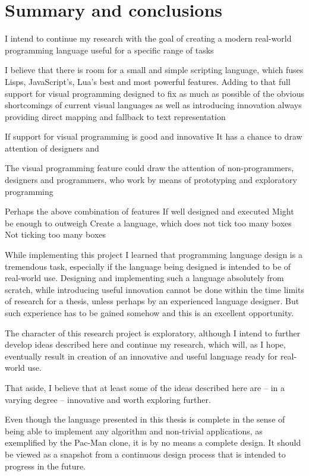 \chapter{Summary and conclusions}\label{chap:summary}
I intend to continue my research with the goal of creating a modern real-world
programming language useful for a specific range of tasks

I believe that there is room for a small and simple scripting language, which fuses Lisps, JavaScript's, Lua's best and most powerful features. Adding to that full support for visual programming designed to fix as much as possible of the obvious shortcomings of current visual languages as well as introducing innovation always providing direct mapping and fallback to text representation  

If support for visual programming is good and innovative
It has a chance to draw attention of designers and 

The visual programming feature could draw the attention of non-programmers, designers and programmers, who work by means of prototyping and exploratory programming

Perhaps the above combination of features
If well designed and executed
Might be enough to outweigh \cite{pl_checklist}
Create a language, which does not tick too many boxes
Not ticking too many boxes


While implementing this project I learned that programming language design is a
tremendous task, especially if the language being designed is intended to be of
real-world use. Designing and implementing such a language absolutely from
scratch, while introducing useful innovation cannot be done within the time
limits of research for a thesis, unless perhaps by an experienced language
designer. But such experience has to be gained somehow and this is an excellent
opportunity.

The character of this research project is exploratory, although I intend to
further develop ideas described here and continue my research, which will, as I
hope, eventually result in creation of an innovative and useful language ready
for real-world use.

That aside, I believe that at least some of the ideas described here are -- in a
varying degree -- innovative and worth exploring further.

Even though the language presented in this thesis is complete in the sense of
being able to implement any algorithm and non-trivial applications, as
exemplified by the Pac-Man clone, it is by no means a complete design. It should
be viewed as a snapshot from a continuous design process that is intended to
progress in the future.